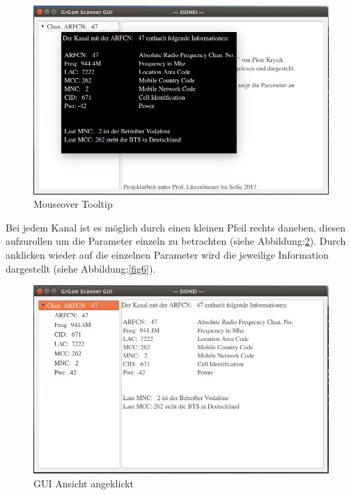 \begin{figure}[H]
\centering
\includegraphics[scale=0.5]{GUI_Tooltip}
\caption{Mouseover Tooltip}
\label{fig4}
\end{figure}

\noindent Bei jedem Kanal ist es möglich durch einen kleinen Pfeil rechts daneben, diesen aufzurollen um die Parameter einzeln zu betrachten (siehe Abbildung:\ref{fig5}). Durch anklicken wieder auf die einzelnen Parameter wird die jeweilige Information dargestellt (siehe Abbildung:\ref{fig6}).


\begin{figure}[H]
\centering
\includegraphics[scale=0.5]{GUI_aufgeklappt}
\caption{GUI Ansicht angeklickt}
\label{fig5}
\end{figure}

